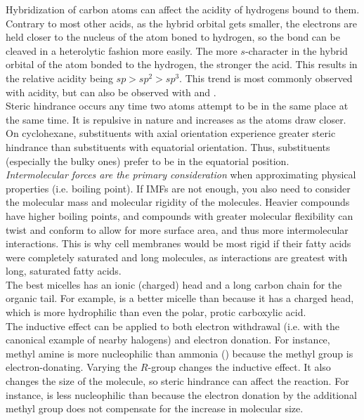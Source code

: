 \documentclass{article}
\theoremstyle{plain}%
\theoremstyle{definition}
\theoremstyle{remark}
\begin{document}
\indent Hybridization of carbon atoms can affect the acidity of hydrogens bound to them. Contrary to most other acids, as the hybrid orbital gets smaller, the electrons are held closer to the nucleus of the atom boned to hydrogen, so the bond can be cleaved in a heterolytic fashion more easily. The more $s$-character in the hybrid orbital of the atom bonded to the hydrogen, the stronger the acid. This results in the relative acidity being $sp>sp^2>sp^3$. This trend is most commonly observed with  acidity, but can also be observed with  and .\\
\indent Steric hindrance occurs any time two atoms attempt to be in the same place at the same time. It is repulsive in nature and increases as the atoms draw closer. On cyclohexane, substituents with axial orientation experience greater steric hindrance than substituents with equatorial orientation. Thus, substituents (especially the bulky ones) prefer to be in the equatorial position.\\
\indent \textit{Intermolecular forces are the primary consideration} when approximating physical properties (i.e. boiling point). If IMFs are not enough, you also need to consider the molecular mass and molecular rigidity of the molecules. Heavier compounds have higher boiling points, and compounds with greater molecular flexibility can twist and conform to allow for more surface area, and thus more intermolecular interactions. This is why cell membranes would be most rigid if their fatty acids were completely saturated and long molecules, as interactions are greatest with long, saturated fatty acids. \\
\indent The best micelles has an ionic (charged) head and a long carbon chain for the organic tail. For example,  is a better micelle than  because it has a charged head, which is more hydrophilic than even the polar, protic carboxylic acid.\\
\indent The inductive effect can be applied to both electron withdrawal (i.e. with the canonical example of nearby halogens) and electron donation. For instance, methyl amine is more nucleophilic than ammonia () because the methyl group is electron-donating. Varying the $R$-group changes the inductive effect. It also changes the size of the molecule, so steric hindrance can affect the reaction. For instance,  is less nucleophilic than  because the electron donation by the additional methyl group does not compensate for the increase in molecular size.\\
\end{document}
